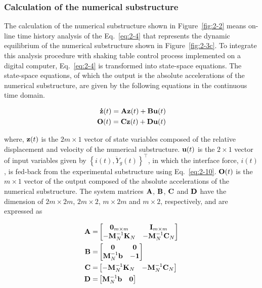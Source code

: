 \subsubsection{Calculation of the numerical substructure}
The calculation of the numerical substructure shown in Figure~\ref{fig:2-2} means on-line time history analysis of the Eq.~\eqref{eq:2-4} that represents the dynamic equilibrium of the numerical substructure shown in Figure~\ref{fig:2-3c}. To integrate this analysis procedure with shaking table control process implemented on a digital computer, Eq.~\eqref{eq:2-4} is transformed into state-space equations. The state-space equations, of which the output is the absolute accelerations of the numerical substructure, are given by the following equations in the continuous time domain.

\begin{equation}\label{eq:2-11}
\begin{aligned}
\mathbf{\dot{z}}(t)=\mathbf{A}\mathbf{z}(t)+\mathbf{B}\mathbf{u}(t)\\
\mathbf{O}(t)=\mathbf{C}\mathbf{z}(t)+\mathbf{D}\mathbf{u}(t)
\end{aligned}
\end{equation}

where, $\mathbf{z}(t)$ is the $2m \times 1$ vector of state variables composed of the relative displacement and velocity of the numerical substructure. $\mathbf{u}(t)$ is the $2 \times 1$ vector of input variables given by $\left\{i(t),\ddot{Y}_{g}(t)\right\}^{\top}$, in which the interface force, $i(t)$, is fed-back from the experimental substructure using Eq.~\eqref{eq:2-10}. $\mathbf{O}(t)$ is the $m \times 1$ vector of the output composed of the absolute accelerations of the numerical substructure.  The system matrices $\mathbf{A}$, $\mathbf{B}$, $\mathbf{C}$ and $\mathbf{D}$ have the dimension of $2m \times 2m$, $2m \times 2$, $m \times 2m$ and $m \times 2$, respectively, and are expressed as

\begin{align}
\mathbf{A}=&\begin{bmatrix} \mathbf{0}_{m\times m}&\mathbf{I}_{m\times m}\\-\mathbf{M}_{N}^{-1}\mathbf{K}_{N}&-\mathbf{M}_{N}^{-1}\mathbf{C}_{N} \end{bmatrix} \label{eq:2-12} \\
\mathbf{B}=&\begin{bmatrix} \mathbf{0} & \mathbf{0} \\ \mathbf{M}_{N}^{-1}\mathbf{b}&\mathbf{-1} \end{bmatrix} \label{eq:2-13} \\
\mathbf{C}=&\begin{bmatrix} -\mathbf{M}_{N}^{-1}\mathbf{K}_{N} & -\mathbf{M}_{N}^{-1}\mathbf{C}_{N} \end{bmatrix}\label{eq:2-14} \\
\mathbf{D}=&\begin{bmatrix} \mathbf{M}_{N}^{-1}\mathbf{b} & \mathbf{0} \end{bmatrix} \label{eq:2-15}
\end{align}

